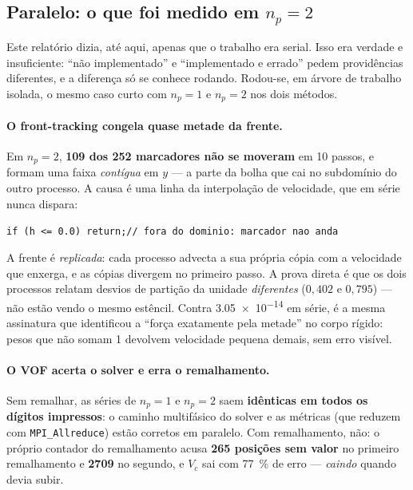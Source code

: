 \subsection{Paralelo: o que foi medido em $n_p=2$}
\label{sec:paralelo}

Este relat\'orio dizia, at\'e aqui, apenas que o trabalho era serial. Isso era
verdade e insuficiente: ``n\~ao implementado'' e ``implementado e errado'' pedem
provid\^encias diferentes, e a diferen\c{c}a s\'o se conhece rodando. Rodou-se,
em \'arvore de trabalho isolada, o mesmo caso curto com $n_p=1$ e $n_p=2$ nos
dois m\'etodos.


\paragraph{O front-tracking congela quase metade da frente.} Em $n_p=2$,
\textbf{109 dos 252 marcadores n\~ao se moveram} em 10 passos, e formam uma faixa
\emph{cont\'igua} em $y$ --- a parte da bolha que cai no subdom\'inio do outro
processo. A causa \'e uma linha da interpola\c{c}\~ao de velocidade, que em s\'erie
nunca dispara:
\begin{center}
\texttt{if (h <= 0.0) return;\qquad // fora do dominio: marcador nao anda}
\end{center}
A frente \'e \emph{replicada}: cada processo advecta a sua pr\'opria c\'opia com
a velocidade que enxerga, e as c\'opias divergem no primeiro passo. A prova
direta \'e que os dois processos relatam desvios de parti\c{c}\~ao da unidade
\emph{diferentes} ($0{,}402$ e $0{,}795$) --- n\~ao est\~ao vendo o mesmo
est\^encil. Contra \num{3.05e-14} em s\'erie, \'e a mesma assinatura que
identificou a ``for\c{c}a exatamente pela metade'' no corpo r\'igido: pesos que
n\~ao somam 1 devolvem velocidade pequena demais, sem erro vis\'ivel.

\paragraph{O VOF acerta o solver e erra o remalhamento.} Sem remalhar, as
s\'eries de $n_p=1$ e $n_p=2$ saem \textbf{id\^enticas em todos os d\'igitos
impressos}: o caminho multif\'asico do solver e as m\'etricas (que reduzem com
\texttt{MPI\_Allreduce}) est\~ao corretos em paralelo. Com remalhamento, n\~ao:
o pr\'oprio contador do remalhamento acusa \textbf{265 posi\c{c}\~oes sem valor}
no primeiro remalhamento e \textbf{2709} no segundo, e $V_c$ sai com
\SI{77}{\percent} de erro --- \emph{caindo} quando devia subir.

